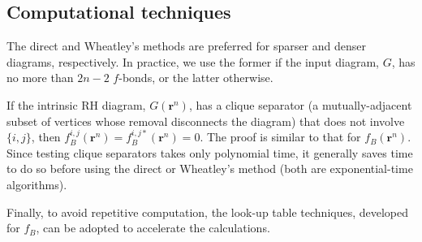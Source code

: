\documentclass[aip,jcp,preprint,superscriptaddress,showpacs,preprintnumbers,amsmath,amssymb]{revtex4-1}
\numberwithin{equation}{section}
\newcommand{\vct}[1]{\mathbf{#1}}
\providecommand{\vr}{} %
\renewcommand{\vr}{\vct{r}}
\begin{document}
\subsection{Computational techniques}




The direct and Wheatley's methods
are preferred for sparser and denser diagrams,
respectively.
%
In practice,
we use the former if the input diagram, $G$,
has no more than $2n-2$ $f$-bonds,
or the latter otherwise.



If the intrinsic RH diagram, $G(\vr^n)$,
has a clique separator
(a mutually-adjacent subset of vertices
whose removal disconnects the diagram)
that does not involve $\{i, j\}$,
then $f_B^{i,j}(\vr^n) = f_B^{i,j*}(\vr^n) = 0$.
%
The proof is similar to that for $f_B(\vr^n)$\cite{zhang2014}.
%
Since testing clique separators takes only polynomial time,
it generally saves time to do so
before using the direct or Wheatley's method
(both are exponential-time algorithms).



Finally, to avoid repetitive computation,
the look-up table techniques\cite{
zhang2014, ree1964a, clisby2006,
ree1967, *labik2005, *schultz2014},
developed for $f_B$,
can be adopted to accelerate the calculations.






\end{document}

